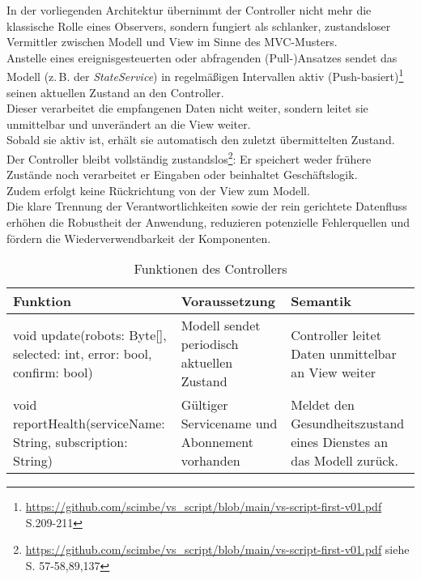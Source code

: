 In der vorliegenden Architektur übernimmt der Controller nicht mehr die klassische Rolle eines Observers, sondern fungiert als schlanker, zustandsloser Vermittler zwischen Modell und View im Sinne des MVC-Musters. \\
Anstelle eines ereignisgesteuerten oder abfragenden (Pull-)Ansatzes sendet das Modell (z.\,B. der \textit{StateService}) in regelmäßigen Intervallen aktiv (Push-basiert)\footnote{\url{https://github.com/scimbe/vs_script/blob/main/vs-script-first-v01.pdf} S.209-211} seinen aktuellen Zustand an den Controller. \\
Dieser verarbeitet die empfangenen Daten nicht weiter, sondern leitet sie unmittelbar und unverändert an die View weiter.\\
Sobald sie aktiv ist, erhält sie automatisch den zuletzt übermittelten Zustand.\\
Der Controller bleibt vollständig zustandslos\footnote{\url{https://github.com/scimbe/vs_script/blob/main/vs-script-first-v01.pdf} siehe S. 57-58,89,137}: Er speichert weder frühere Zustände noch verarbeitet er Eingaben oder beinhaltet Geschäftslogik. \\
Zudem erfolgt keine Rückrichtung von der View zum Modell. \\
Die klare Trennung der Verantwortlichkeiten sowie der rein gerichtete Datenfluss erhöhen die Robustheit der Anwendung, reduzieren potenzielle Fehlerquellen und fördern die Wiederverwendbarkeit der Komponenten.\\
\begin{table}[h!]
    \centering
    \begin{tabular}{|p{5cm}|p{5cm}|p{5cm}|}
        \hline
        \textbf{Funktion} & \textbf{Voraussetzung} & \textbf{Semantik} \\
        \hline
        void update(robots: Byte[], selected: int, error: bool, confirm: bool) & Modell sendet periodisch aktuellen Zustand & Controller leitet Daten unmittelbar an View weiter \\
        \hline
        void reportHealth(serviceName: String, subscription: String) & Gültiger Servicename und Abonnement vorhanden & Meldet den Gesundheitszustand eines Dienstes an das Modell zurück. \\
        \hline
    \end{tabular}
    \caption{Funktionen des Controllers}
    \label{tab:Controller}
\end{table}

\clearpage

